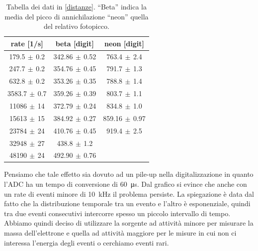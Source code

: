 \begin{table}[h]
\centering
\begin{tabular}{c|c|c}
rate [1/s] & beta [digit] & neon [digit] \\
\hline
 179.5$\,\pm\,$0.2 & 342.86$\,\pm\,$0.52 & 763.4$\,\pm\,$2.4 \\
 247.7$\,\pm\,$0.2 & 354.76$\,\pm\,$0.45 & 791.7$\,\pm\,$1.3 \\
 632.8$\,\pm\,$0.2 & 353.26$\,\pm\,$0.35 & 788.8$\,\pm\,$1.4 \\
3583.7$\,\pm\,$0.7 & 359.26$\,\pm\,$0.39 & 803.7$\,\pm\,$1.1 \\
  11086$\,\pm\,$14 & 372.79$\,\pm\,$0.24 & 834.8$\,\pm\,$1.0 \\
  15613$\,\pm\,$15 & 384.92$\,\pm\,$0.27 & 859.16$\,\pm\,$0.97 \\
  23784$\,\pm\,$24 & 410.76$\,\pm\,$0.45 & 919.4$\,\pm\,$2.5 \\
  32948$\,\pm\,$27 & 438.8$\,\pm\,$1.2 &         \\
  48190$\,\pm\,$24 & 492.90$\,\pm\,$0.76 &        
\end{tabular}

\caption{Tabella dei dati in \autoref{distanze}. ``Beta'' indica la media del picco di annichilazione ``neon'' quella del relativo fotopicco.}
\label{tabella forte}
\end{table}

Pensiamo che tale effetto sia dovuto ad un pile-up nella digitalizzazione in quanto l'ADC ha un tempo di conversione di \SI{60}{\micro s}.
Dal grafico si evince che anche con un rate di eventi minore di \SI{10}{kHz} il problema persiste. La spiegazione è data dal fatto che la distribuzione temporale tra un evento e l'altro è esponenziale, quindi tra due eventi consecutivi intercorre spesso un piccolo intervallo di tempo.
Abbiamo quindi deciso di utilizzare la sorgente ad attività minore per misurare la massa dell'elettrone e quella ad attività maggiore per le misure in cui non ci interessa l'energia degli eventi o cerchiamo eventi rari.

